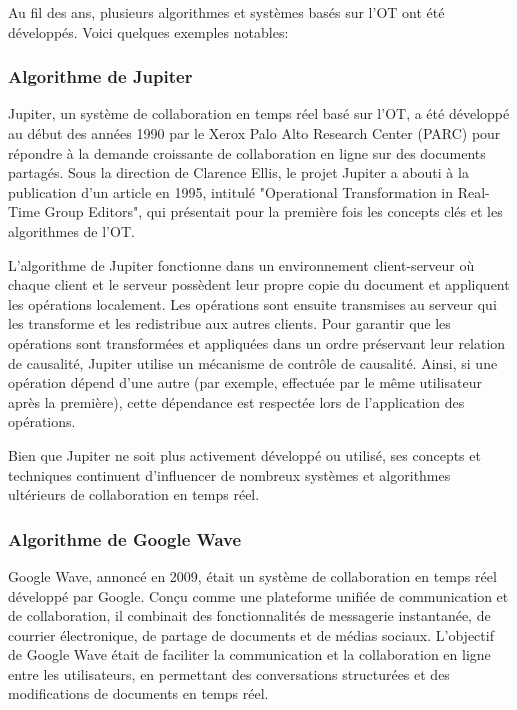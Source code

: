Au fil des ans, plusieurs algorithmes et systèmes basés sur l'OT ont été développés. Voici quelques exemples notables:

\subsubsection{Algorithme de Jupiter}

Jupiter, un système de collaboration en temps réel basé sur l'OT, a été développé au début des années 1990 par le Xerox Palo Alto Research Center (PARC) pour répondre à la demande croissante de collaboration en ligne sur des documents partagés\cite{jupiter}. Sous la direction de Clarence Ellis, le projet Jupiter a abouti à la publication d'un article en 1995, intitulé "Operational Transformation in Real-Time Group Editors"\cite{ellis1995}, qui présentait pour la première fois les concepts clés et les algorithmes de l'OT.

L'algorithme de Jupiter fonctionne dans un environnement client-serveur où chaque client et le serveur possèdent leur propre copie du document et appliquent les opérations localement\cite{jupiter}. Les opérations sont ensuite transmises au serveur qui les transforme et les redistribue aux autres clients. Pour garantir que les opérations sont transformées et appliquées dans un ordre préservant leur relation de causalité, Jupiter utilise un mécanisme de contrôle de causalité\cite{ellis1995}. Ainsi, si une opération dépend d'une autre (par exemple, effectuée par le même utilisateur après la première), cette dépendance est respectée lors de l'application des opérations.

Bien que Jupiter ne soit plus activement développé ou utilisé, ses concepts et techniques continuent d'influencer de nombreux systèmes et algorithmes ultérieurs de collaboration en temps réel.

\subsubsection{Algorithme de Google Wave}

Google Wave, annoncé en 2009, était un système de collaboration en temps réel développé par Google\cite{googlewave}. Conçu comme une plateforme unifiée de communication et de collaboration, il combinait des fonctionnalités de messagerie instantanée, de courrier électronique, de partage de documents et de médias sociaux. L'objectif de Google Wave était de faciliter la communication et la collaboration en ligne entre les utilisateurs, en permettant des conversations structurées et des modifications de documents en temps réel\cite{googlewave}.

